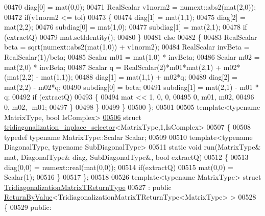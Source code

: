 \begin{DoxyCode}
00470     diag[0] = mat(0,0);
00471     RealScalar v1norm2 = numext::abs2(mat(2,0));
00472     \textcolor{keywordflow}{if}(v1norm2 <= tol)
00473     \{
00474       diag[1] = mat(1,1);
00475       diag[2] = mat(2,2);
00476       subdiag[0] = mat(1,0);
00477       subdiag[1] = mat(2,1);
00478       \textcolor{keywordflow}{if} (extractQ)
00479         mat.setIdentity();
00480     \}
00481     \textcolor{keywordflow}{else}
00482     \{
00483       RealScalar beta = sqrt(numext::abs2(mat(1,0)) + v1norm2);
00484       RealScalar invBeta = RealScalar(1)/beta;
00485       Scalar m01 = mat(1,0) * invBeta;
00486       Scalar m02 = mat(2,0) * invBeta;
00487       Scalar q = RealScalar(2)*m01*mat(2,1) + m02*(mat(2,2) - mat(1,1));
00488       diag[1] = mat(1,1) + m02*q;
00489       diag[2] = mat(2,2) - m02*q;
00490       subdiag[0] = beta;
00491       subdiag[1] = mat(2,1) - m01 * q;
00492       \textcolor{keywordflow}{if} (extractQ)
00493       \{
00494         mat << 1,   0,    0,
00495                0, m01,  m02,
00496                0, m02, -m01;
00497       \}
00498     \}
00499   \}
00500 \};
00501 
00505 \textcolor{keyword}{template}<\textcolor{keyword}{typename} MatrixType, \textcolor{keywordtype}{bool} IsComplex>
\hyperlink{struct_eigen_1_1internal_1_1tridiagonalization__inplace__selector_3_01_matrix_type_00_011_00_01_is_complex_01_4}{00506} \textcolor{keyword}{struct }\hyperlink{struct_eigen_1_1internal_1_1tridiagonalization__inplace__selector}{tridiagonalization\_inplace\_selector}<MatrixType,1,IsComplex>
00507 \{
00508   \textcolor{keyword}{typedef} \textcolor{keyword}{typename} MatrixType::Scalar Scalar;
00509 
00510   \textcolor{keyword}{template}<\textcolor{keyword}{typename} DiagonalType, \textcolor{keyword}{typename} SubDiagonalType>
00511   \textcolor{keyword}{static} \textcolor{keywordtype}{void} run(MatrixType& mat, DiagonalType& diag, SubDiagonalType&, \textcolor{keywordtype}{bool} extractQ)
00512   \{
00513     diag(0,0) = numext::real(mat(0,0));
00514     \textcolor{keywordflow}{if}(extractQ)
00515       mat(0,0) = Scalar(1);
00516   \}
00517 \};
00518 
00526 \textcolor{keyword}{template}<\textcolor{keyword}{typename} MatrixType> \textcolor{keyword}{struct }\hyperlink{struct_eigen_1_1internal_1_1_tridiagonalization_matrix_t_return_type}{TridiagonalizationMatrixTReturnType}
00527 : \textcolor{keyword}{public} \hyperlink{group___core___module_class_eigen_1_1_return_by_value}{ReturnByValue}<TridiagonalizationMatrixTReturnType<MatrixType> >
00528 \{
00529   \textcolor{keyword}{public}:

\end{DoxyCode}
